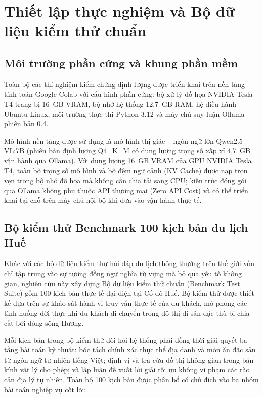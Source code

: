 \section{Thiết lập thực nghiệm và Bộ dữ liệu kiểm thử chuẩn}
\label{sec:ch2-setup}

\subsection{Môi trường phần cứng và khung phần mềm}
\label{subsec:ch2-environment}

Toàn bộ các thí nghiệm kiểm chứng định lượng được triển khai trên nền tảng tính toán Google Colab với cấu hình phần cứng: bộ xử lý đồ họa NVIDIA Tesla T4 trang bị 16~GB VRAM, bộ nhớ hệ thống 12,7~GB RAM, hệ điều hành Ubuntu Linux, môi trường thực thi Python 3.12 và máy chủ suy luận Ollama phiên bản 0.4.

Mô hình nền tảng được sử dụng là mô hình thị giác -- ngôn ngữ lớn Qwen2.5-VL:7B (phiên bản định lượng Q4\_K\_M có dung lượng trọng số xấp xỉ 4,7~GB vận hành qua Ollama). Với dung lượng 16~GB VRAM của GPU NVIDIA Tesla T4, toàn bộ trọng số mô hình và bộ đệm ngữ cảnh (KV Cache) được nạp trọn vẹn trong bộ nhớ đồ họa mà không cần chia tải sang CPU; kiến trúc đóng gói qua Ollama không phụ thuộc API thương mại (Zero API Cost) và có thể triển khai tại chỗ trên máy chủ nội bộ khi đưa vào vận hành thực tế.

\subsection{Bộ kiểm thử Benchmark 100 kịch bản du lịch Huế}
\label{subsec:ch2-benchmark-suite}

Khác với các bộ dữ liệu kiểm thử hỏi đáp du lịch thông thường trên thế giới vốn chỉ tập trung vào sự tương đồng ngữ nghĩa từ vựng mà bỏ qua yếu tố không gian, nghiên cứu này xây dựng Bộ dữ liệu kiểm thử chuẩn (Benchmark Test Suite) gồm 100 kịch bản thực tế đại diện tại Cố đô Huế. Bộ kiểm thử được thiết kế dựa trên sự khảo sát hành vi truy vấn thực tế của du khách, mô phỏng các tình huống đời thực khi du khách di chuyển trong đô thị di sản đặc thù bị chia cắt bởi dòng sông Hương.

Mỗi kịch bản trong bộ kiểm thử đòi hỏi hệ thống phải đồng thời giải quyết ba tầng bài toán kỹ thuật: bóc tách chính xác thực thể địa danh và món ăn đặc sản từ ngôn ngữ tự nhiên tiếng Việt; định vị và tra cứu đồ thị không gian trong bán kính vật lý cho phép; và lập luận đề xuất lời giải tối ưu không vi phạm các rào cản địa lý tự nhiên. Toàn bộ 100 kịch bản được phân bổ có chủ đích vào ba nhóm bài toán nghiệp vụ cốt lõi:

